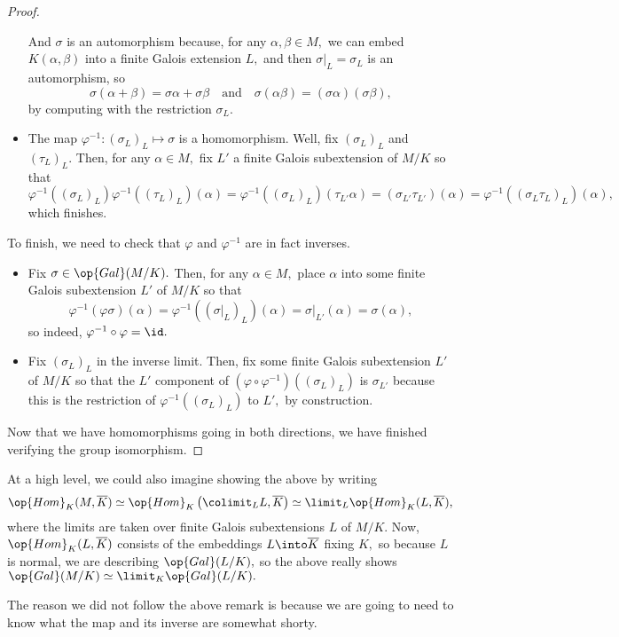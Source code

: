 \documentclass[../notes.tex]{subfiles}
\begin{document}
\begin{proof}
\begin{itemize}
		And $\sigma$ is an automorphism because, for any $\alpha,\beta\in M,$ we can embed $K(\alpha,\beta)$ into a finite Galois extension $L,$ and then $\sigma|_L=\sigma_L$ is an automorphism, so
		\[\sigma(\alpha+\beta)=\sigma\alpha+\sigma\beta\quad\text{and}\quad\sigma(\alpha\beta)=(\sigma\alpha)(\sigma\beta),\]
		by computing with the restriction $\sigma_L.$
		\item The map $\varphi^{-1}:(\sigma_L)_L\mapsto\sigma$ is a homomorphism. Well, fix $(\sigma_L)_L$ and $(\tau_L)_L.$ Then, for any $\alpha\in M,$ fix $L'$ a finite Galois subextension of $M/K$ so that
		\[\varphi^{-1}\left((\sigma_L)_L\right)\varphi^{-1}\left((\tau_L)_L\right)(\alpha)=\varphi^{-1}\left((\sigma_L)_L\right)(\tau_{L'}\alpha)=(\sigma_{L'}\tau_{L'})(\alpha)=\varphi^{-1}\left((\sigma_L\tau_L)_L\right)(\alpha),\]
		which finishes.
	\end{itemize}
	To finish, we need to check that $\varphi$ and $\varphi^{-1}$ are in fact inverses.
	\begin{itemize}
		\item Fix $\sigma\in\op{Gal}(M/K).$ Then, for any $\alpha\in M,$ place $\alpha$ into some finite Galois subextension $L'$ of $M/K$ so that
		\[\varphi^{-1}(\varphi\sigma)(\alpha)=\varphi^{-1}\left((\sigma|_L)_L\right)(\alpha)=\sigma|_{L'}(\alpha)=\sigma(\alpha),\]
		so indeed, $\varphi^{-1}\circ\varphi=\id.$
		\item Fix $(\sigma_L)_L$ in the inverse limit. Then, fix some finite Galois subextension $L'$ of $M/K$ so that the $L'$ component of $\left(\varphi\circ\varphi^{-1}\right)\left((\sigma_L)_L\right)$ is $\sigma_{L'}$ because this is the restriction of $\varphi^{-1}\left((\sigma_L)_L\right)$ to $L',$ by construction.
	\end{itemize}
	Now that we have homomorphisms going in both directions, we have finished verifying the group isomorphism.
\end{proof}
\begin{remark} \label{rem:krullprofiniteintuition}
	At a high level, we could also imagine showing the above by writing
	\[\op{Hom}_K(M,\overline K)\simeq\op{Hom}_K\left(\colimit_LL,\overline K\right)\simeq\limit_L\op{Hom}_K(L,\overline K),\]
	where the limits are taken over finite Galois subextensions $L$ of $M/K.$ Now, $\op{Hom}_K(L,\overline K)$ consists of the embeddings $L\into\overline K$ fixing $K,$ so because $L$ is normal, we are describing $\op{Gal}(L/K),$ so the above really shows $\op{Gal}(M/K)\simeq\limit_K\op{Gal}(L/K).$
\end{remark}
The reason we did not follow the above remark is because we are going to need to know what the map and its inverse are somewhat shorty.
\end{document}
